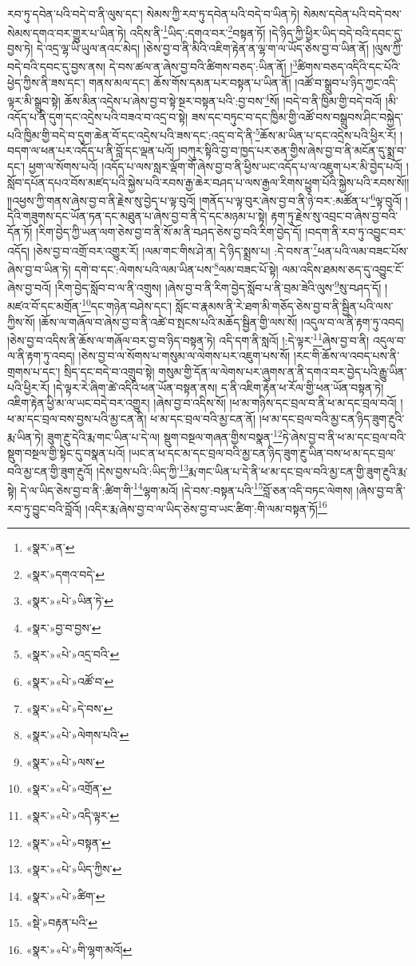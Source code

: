 རབ་ཏུ་དབེན་པའི་བདེ་བ་ནི་ལུས་དང་། སེམས་ཀྱི་རབ་ཏུ་དབེན་པའི་བདེ་བ་ཡིན་ཏེ། སེམས་དབེན་པའི་བདེ་བས་སེམས་དགའ་བར་གྱུར་པ་ཡིན་ཏེ། འདིས་ནི་\footnote{«སྣར་»ན་}ཡིད་:དགའ་བར་\footnote{«སྣར་»དགའ་བདེ་}བསྟན་ཏོ། །དེ་ཉིད་ཀྱི་ཕྱིར་ཡིད་བདེ་བའི་དབང་དུ་བྱས་ཏེ། དེ་འདྲ་ལྷ་ཡི་ཡུལ་ནའང་མེད། །ཅེས་བྱ་བ་ནི་མིའི་འཇིག་རྟེན་ན་ལྷ་ག་ལ་ཡོད་ཅེས་བྱ་བ་ཡིན་ནོ། །ལུས་ཀྱི་བདེ་བའི་དབང་དུ་བྱས་ནས། དེ་བས་ཚལ་ན་ཞེས་བྱ་བའི་ཚིགས་བཅད་:ཡིན་ནོ། །\footnote{«སྣར་»«པེ་»ཡིན་ཏེ་}ཚིགས་བཅད་འདིའི་དང་པོའི་ཕྱེད་ཀྱིས་ནི་ཟས་དང་། གནས་མལ་དང་། ཆོས་གོས་དམན་པར་བསྟན་པ་ཡིན་ནོ། །འཚོ་བ་སྒྲུབ་པ་ཉིད་ཀྱང་འདི་ལྟར་མི་སྒྲུབ་སྟེ། ཆོས་མིན་འདྲེས་པ་ཞེས་བྱ་བ་སྟེ་སྔར་བསྟན་པའི་:བྱ་བས་\footnote{«སྣར་»བྱ་བ་བྱས་}སོ། །བདེ་བ་ནི་ཁྱིམ་གྱི་བདེ་བའོ། །མི་འདོད་པ་ནི་དུག་དང་འདྲེས་པའི་བཟའ་བ་འདྲ་བ་སྟེ། ཟས་དང་བཏུང་བ་དང་ཁྱིམ་གྱི་འཚོ་བས་བསྒྲུབས་ཤིང་བསྐྱེད་པའི་ཁྱིམ་གྱི་བདེ་བ་དུག་ཆེན་བོ་དང་འདྲེས་པའི་ཟས་དང་:འདྲ་བ་དེ་ནི་\footnote{«སྣར་»«པེ་»འདྲ་བའི་}ཆོས་མ་ཡིན་པ་དང་འདྲེས་པའི་ཕྱིར་རོ། །བདག་ལ་ཕན་པར་འདོད་པ་ནི་བློ་དང་ལྡན་པའོ། །བཀུར་སྟིའི་བྱ་བ་ཁྱད་པར་ཅན་གྱིས་ཞེས་བྱ་བ་ནི་མངོན་དུ་སྨྲ་བ་དང་། ཕྱག་ལ་སོགས་པའོ། །འདོད་པ་ལས་སླར་ལྡོག་གོ་ཞེས་བྱ་བ་ནི་ཕྱིས་ཡང་འདོད་པ་ལ་འཇུག་པར་མི་བྱེད་པའོ། །སློབ་དཔོན་དཔའ་བོས་མཛད་པའི་སྐྱེས་པའི་རབས་རྒྱ་ཆེར་བཤད་པ་ལས་རྒྱལ་རིགས་ཕྱུག་པོའི་སྐྱེས་པའི་རབས་སོ།། །།འཕྱས་ཀྱི་གནས་ཞེས་བྱ་བ་ནི་རྗེས་སུ་བྱེད་པ་ལྟ་བུའོ། །གནོད་པ་ལྟ་བུར་ཞེས་བྱ་བ་ནི་ཉེ་བར་:མཚོན་པ་\footnote{«སྣར་»«པེ་»འཚོ་བ་}ལྟ་བུའོ། །དེའི་གཟུགས་དང་ཡོན་ཏན་དང་མཐུན་པ་ཞེས་བྱ་བ་ནི་དེ་དང་མཉམ་པ་སྟེ། རྟག་ཏུ་རྗེས་སུ་འབྲང་བ་ཞེས་བྱ་བའི་དོན་ཏོ། །རིག་བྱེད་ཀྱི་ཡན་ལག་ཅེས་བྱ་བ་ནི་སོ་མ་ནི་བཤད་ཅེས་བྱ་བའི་རིག་བྱེད་དོ། །བདག་ནི་རབ་ཏུ་འབྱུང་བར་འདོད། །ཅེས་བྱ་བ་འགྲོ་བར་འགྱུར་རོ། །ལམ་གང་གིས་ཤེ་ན། དེ་ཉིད་སྨྲས་པ། :དེ་བས་ན་\footnote{«སྣར་»«པེ་»དེ་བས་}ཕན་པའི་ལམ་བཟང་པོས་ཞེས་བྱ་བ་ཡིན་ཏེ། དགེ་བ་དང་:ལེགས་པའི་ལམ་ཡིན་པས་\footnote{«སྣར་»«པེ་»ལེགས་པའི་}ལམ་བཟང་པོ་སྟེ། ལམ་འདིས་ཐམས་ཅད་དུ་འབྱུང་ངོ་ཞེས་བྱ་བའོ། །རིག་བྱེད་སློབ་བ་ལ་ནི་འགྲུས། །ཞེས་བྱ་བ་ནི་རིག་བྱེད་སློབ་པ་ནི་བྲམ་ཟེའི་ལུས་\footnote{«སྣར་»«པེ་»ལས་}སུ་བཤད་དོ། །མཛའ་བོ་དང་མགྲོན་\footnote{«སྣར་»«པེ་»འགྲོན་}དང་གཉེན་བཤེས་དང་། སློང་བ་རྣམས་ནི་རེ་ཐག་མི་གཅོད་ཅེས་བྱ་བ་ནི་སྦྱིན་པའི་ལས་ཀྱིས་སོ། །ཆོས་ལ་གཞོལ་བ་ཞེས་བྱ་བ་ནི་འཚེ་བ་སྤངས་པའི་མཆོད་སྦྱིན་གྱི་ལས་སོ། །འདུལ་བ་ལ་ནི་རྟག་ཏུ་འབད། །ཅེས་བྱ་བ་འདིས་ནི་ཆོས་ལ་གཞོལ་བར་བྱ་བ་ཉིད་བསྟན་ཏེ། འདི་དག་ནི་སླའོ། །:དེ་ལྟར་\footnote{«སྣར་»«པེ་»འདི་ལྟར་}ཞེས་བྱ་བ་ནི། འདུལ་བ་ལ་ནི་རྟག་ཏུ་འབད། །ཅེས་བྱ་བ་ལ་སོགས་པ་གསུམ་ལ་ལེགས་པར་འཇུག་པས་སོ། །རང་གི་ཆོས་ལ་འབད་པས་ནི་གྲགས་པ་དང་། སྲིད་དང་བདེ་བ་འགྲུབ་སྟེ། གསུམ་གྱི་དོན་ལ་ལེགས་པར་ཞུགས་ན་ནི་དགའ་བར་བྱེད་པའི་རྒྱུ་ཡིན་པའི་ཕྱིར་རོ། །དེ་ལྟར་རེ་ཞིག་ཚེ་འདིའི་ཕན་ཡོན་བསྟན་ནས། ད་ནི་འཇིག་རྟེན་ཕ་རོལ་གྱི་ཕན་ཡོན་བསྟན་ཏེ། འཇིག་རྟེན་ཕྱི་མ་ལ་ཡང་བདེ་བར་འགྱུར། །ཞེས་བྱ་བ་འདིས་སོ། །ཕ་མ་གཉིས་དང་བྲལ་བ་ནི་ཕ་མ་དང་བྲལ་བའོ། །ཕ་མ་དང་བྲལ་བས་བྱས་པའི་མྱ་ངན་ནི། ཕ་མ་དང་བྲལ་བའི་མྱ་ངན་ནོ། །ཕ་མ་དང་བྲལ་བའི་མྱ་ངན་ཉིད་ཟུག་རྔུའི་རྨ་ཡིན་ཏེ། ཟུག་རྔུ་དེའི་རྨ་གང་ཡིན་པ་དེ་ལ། སྡུག་བསྔལ་གཞན་གྱིས་བསྣན་\footnote{«སྣར་»«པེ་»བསྟན་}ཏེ་ཞེས་བྱ་བ་ནི་ཕ་མ་དང་བྲལ་བའི་སྡུག་བསྔལ་གྱི་སྟེང་དུ་བསྣན་པའོ། །ཡང་ན་ཕ་དང་མ་དང་བྲལ་བའི་མྱ་ངན་ཉིད་ཟུག་རྔུ་ཡིན་བས་ཕ་མ་དང་བྲལ་བའི་མྱ་ངན་གྱི་ཟུག་རྔུའོ། །དེས་བྱས་པའི་:ཡིད་ཀྱི་\footnote{«སྣར་»«པེ་»ཡིད་ཀྱིས་}རྨ་གང་ཡིན་པ་དེ་ནི་ཕ་མ་དང་བྲལ་བའི་མྱ་ངན་གྱི་ཟུག་རྔུའི་རྨ་སྟེ། དེ་ལ་ཡིད་ཅེས་བྱ་བ་ནི་:ཚིག་གི་\footnote{«སྣར་»«པེ་»ཚིག་}ལྷག་མའོ། །དེ་བས་:བསྟན་པའི་\footnote{«སྡེ་»བརྟན་པའི་}བློ་ཅན་འདི་བཏང་ལེགས། །ཞེས་བྱ་བ་ནི་རབ་ཏུ་བྱུང་བའི་བློའོ། །འདིར་རྨ་ཞེས་བྱ་བ་ལ་ཡིད་ཅེས་བྱ་བ་ཡང་ཚིག་:གི་ལམ་བསྟན་ཏོ།\footnote{«སྣར་»«པེ་»གི་ལྷག་མའོ།} 